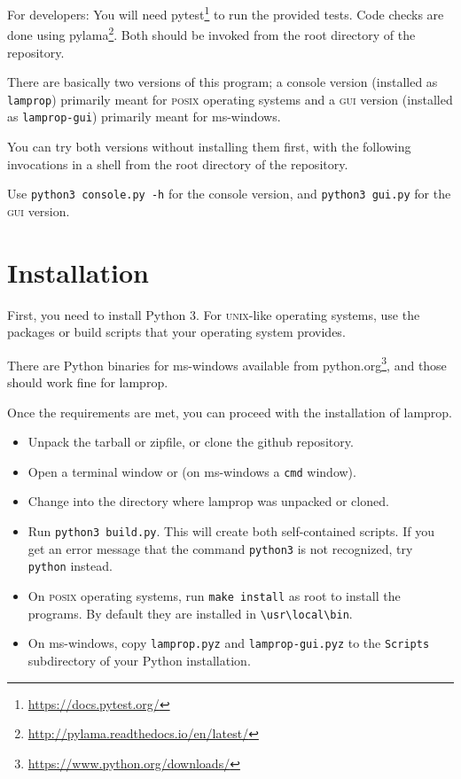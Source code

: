 \documentclass[a4paper,landscape,oneside,11pt,twocolumn]{memoir}
\begin{document}
For developers: You will need pytest\footnote{\url{https://docs.pytest.org/}}
to run the provided tests. Code checks are done using
pylama\footnote{\url{http://pylama.readthedocs.io/en/latest/}}. Both should be
invoked from the root directory of the repository.

There are basically two versions of this program; a console version (installed
as \texttt{lamprop}) primarily meant for \textsc{posix} operating systems and
a \textsc{gui} version (installed as \texttt{lamprop-gui}) primarily meant for
ms-windows.

You can try both versions without installing them first, with the following
invocations in a shell from the root directory of the repository.

Use \texttt{python3 console.py -h} for the console version, and
\texttt{python3 gui.py} for the \textsc{gui} version.

\section{Installation} %

First, you need to install Python 3. For \textsc{unix}-like operating systems,
use the packages or build scripts that your operating system provides.

There are Python binaries for ms-windows available from
python.org\footnote{\url{https://www.python.org/downloads/}}, and those should
work fine for lamprop.

Once the requirements are met, you can proceed with the installation of lamprop.

\begin{itemize}
    \item Unpack the tarball or zipfile, or clone the github repository.
    \item Open a terminal window or (on ms-windows a \texttt{cmd} window).
    \item Change into the directory where lamprop was unpacked or cloned.
    \item Run \texttt{python3 build.py}. This will create both self-contained
        scripts. If you get an error message that the command
        \texttt{python3} is not recognized, try \texttt{python} instead.
    \item On \textsc{posix} operating systems, run \texttt{make install} as
        root to install the programs. By default they are installed in
        \verb|\usr\local\bin|.
    \item On ms-windows, copy \texttt{lamprop.pyz} and
        \texttt{lamprop-gui.pyz} to the \texttt{Scripts} subdirectory of your
        Python installation.
\end{itemize}
\end{document}
